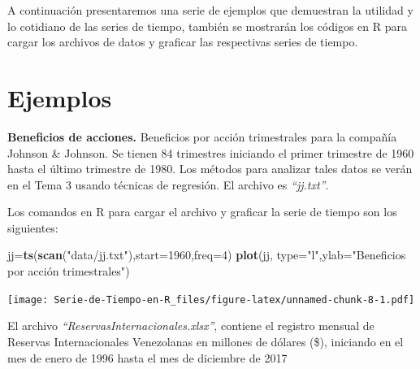 \documentclass[12pt,]{krantz}
\makeatletter
\newenvironment{Shaded}{\begin{snugshade}}{\end{snugshade}}
\newcommand{\KeywordTok}[1]{\textcolor[rgb]{0.13,0.29,0.53}{\textbf{#1}}}
\newcommand{\DataTypeTok}[1]{\textcolor[rgb]{0.13,0.29,0.53}{#1}}
\newcommand{\DecValTok}[1]{\textcolor[rgb]{0.00,0.00,0.81}{#1}}
\newcommand{\StringTok}[1]{\textcolor[rgb]{0.31,0.60,0.02}{#1}}
\newcommand{\CommentTok}[1]{\textcolor[rgb]{0.56,0.35,0.01}{\textit{#1}}}
\newcommand{\NormalTok}[1]{#1}
\newenvironment{kframe}{%
\medskip{}
\setlength{\fboxsep}{.8em}
 \def\at@end@of@kframe{}%
 \ifinner\ifhmode%
  \def\at@end@of@kframe{\end{minipage}}%
  \begin{minipage}{\columnwidth}%
 \fi\fi%
 \def\FrameCommand##1{\hskip\@totalleftmargin \hskip-\fboxsep
 \colorbox{shadecolor}{##1}\hskip-\fboxsep
     \hskip-\linewidth \hskip-\@totalleftmargin \hskip\columnwidth}%
 \MakeFramed {\advance\hsize-\width
   \@totalleftmargin\z@ \linewidth\hsize
   \@setminipage}}%
 {\par\unskip\endMakeFramed%
 \at@end@of@kframe}
\renewenvironment{Shaded}{\begin{kframe}}{\end{kframe}}
\theoremstyle{definition}
\theoremstyle{definition}
\theoremstyle{definition}
\theoremstyle{remark}
\let\BeginKnitrBlock\begin \let\EndKnitrBlock\end
\makeatother
\begin{document}
A continuación presentaremos una serie de ejemplos que demuestran la
utilidad y lo cotidiano de las series de tiempo, también se mostrarán
los códigos en R para cargar los archivos de datos y graficar las
respectivas series de tiempo.

\section{Ejemplos}\label{ejemplos}

\BeginKnitrBlock{example}
\protect\hypertarget{exm:ejem-beneficios-acciones}{}{\label{exm:ejem-beneficios-acciones}
}\textbf{Beneficios de acciones.} Beneficios por acción trimestrales
para la compañía Johnson \& Johnson. Se tienen 84 trimestres iniciando
el primer trimestre de 1960 hasta el último trimestre de 1980. Los
métodos para analizar tales datos se verán en el Tema 3 usando técnicas
de regresión. El archivo es \emph{``jj.txt''}.

Los comandos en R para cargar el archivo y graficar la serie de tiempo
son los siguientes:
\EndKnitrBlock{example}

\begin{Shaded}
\begin{Highlighting}[]
\NormalTok{jj=}\KeywordTok{ts}\NormalTok{(}\KeywordTok{scan}\NormalTok{(}\StringTok{"data/jj.txt"}\NormalTok{),}\DataTypeTok{start=}\DecValTok{1960}\NormalTok{,}\DataTypeTok{freq=}\DecValTok{4}\NormalTok{) }
\KeywordTok{plot}\NormalTok{(jj, }\DataTypeTok{type=}\StringTok{"l"}\NormalTok{,}\DataTypeTok{ylab=}\StringTok{"Beneficios por acción trimestrales"}\NormalTok{)}
\end{Highlighting}
\end{Shaded}

\texttt{[image: Serie-de-Tiempo-en-R\_files/figure-latex/unnamed-chunk-8-1.pdf]}

\BeginKnitrBlock{example}
\protect\hypertarget{exm:reservas-internacionales}{}{\label{exm:reservas-internacionales}
}El archivo \emph{``ReservasInternacionales.xlsx''}, contiene el
registro mensual de Reservas Internacionales Venezolanas en millones de
dólares (\$), iniciando en el mes de enero de 1996 hasta el mes de
diciembre de 2017
\EndKnitrBlock{example}

\begin{Shaded}
\end{Shaded}
\end{document}
